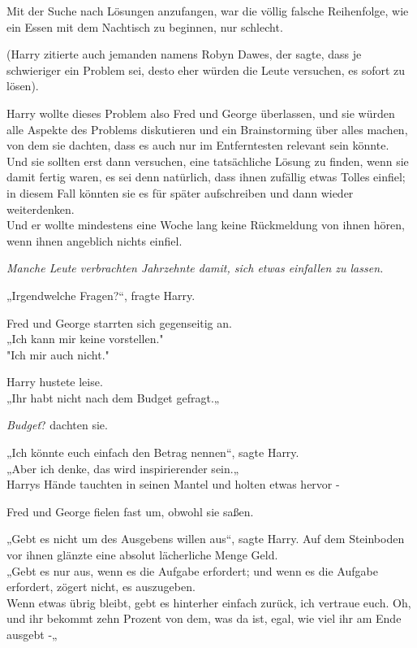 {Mit der Suche nach Lösungen anzufangen, war die völlig falsche Reihenfolge, wie ein Essen mit dem Nachtisch zu beginnen, nur schlecht.

(Harry zitierte auch jemanden namens Robyn Dawes, der sagte, dass je schwieriger ein Problem sei, desto eher würden die Leute versuchen, es sofort zu lösen).

Harry wollte dieses Problem also Fred und George überlassen, und sie würden alle Aspekte des Problems diskutieren und ein Brainstorming über alles machen, von dem sie dachten, dass es auch nur im Entferntesten relevant sein könnte.\\ Und sie sollten erst dann versuchen, eine tatsächliche Lösung zu finden, wenn sie damit fertig waren, es sei denn natürlich, dass ihnen zufällig etwas Tolles einfiel; in diesem Fall könnten sie es für später aufschreiben und dann wieder weiterdenken.\\ Und er wollte mindestens eine Woche lang keine Rückmeldung von ihnen hören, wenn ihnen angeblich nichts einfiel.

\emph{Manche Leute verbrachten Jahrzehnte damit, sich etwas einfallen zu lassen.}

„Irgendwelche Fragen?“, fragte Harry.

Fred und George starrten sich gegenseitig an.\\ „Ich kann mir keine vorstellen."\\ "Ich mir auch nicht."

Harry hustete leise.\\ „Ihr habt nicht nach dem Budget gefragt.„

\emph{Budget}? dachten sie.

„Ich könnte euch einfach den Betrag nennen“, sagte Harry.\\ „Aber ich denke, das wird inspirierender sein.„\\ Harrys Hände tauchten in seinen Mantel und holten etwas hervor -

Fred und George fielen fast um, obwohl sie saßen.

„Gebt es nicht um des Ausgebens willen aus“, sagte Harry. Auf dem Steinboden vor ihnen glänzte eine absolut lächerliche Menge Geld.\\ „Gebt es nur aus, wenn es die Aufgabe erfordert; und wenn es die Aufgabe erfordert, zögert nicht, es auszugeben.\\ Wenn etwas übrig bleibt, gebt es hinterher einfach zurück, ich vertraue euch. Oh, und ihr bekommt zehn Prozent von dem, was da ist, egal, wie viel ihr am Ende ausgebt -„

}
